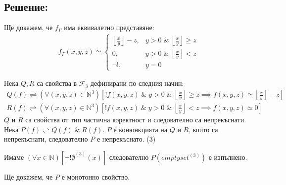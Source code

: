 \documentclass{article}
\begin{document}
\subsection*{Решение:}
Ще докажем, че \(f_\Gamma\) има еквивалетно представяне:
\begin{align*}
f_\Gamma(x, y, z) \simeq \begin{cases}
    \displaystyle\left\lfloor\frac{x}{y}\right\rfloor - z, & y > 0 \; \& \; \displaystyle\left\lfloor\frac{x}{y}\right\rfloor \geq z \\
    0, & y > 0 \; \& \; \displaystyle\left\lfloor\frac{x}{y}\right\rfloor < z \\
    \lnot!, & y = 0
\end{cases}
\end{align*}

Нека \(Q, R\) са свойства в \(\mathcal{F}_3\)
дефинирани по следния начин:
\begin{align*}
Q(f) \rightleftharpoons (\forall (x, y, z) \in \mathbb{N}^3)[!f(x, y, z) \; \& \; y > 0 \; \& \; \displaystyle\left\lfloor\frac{x}{y}\right\rfloor \geq z \implies f(x, y, z) \simeq \displaystyle\left\lfloor\frac{x}{y}\right\rfloor - z] \\
R(f) \rightleftharpoons (\forall (x, y, z) \in \mathbb{N}^3)[!f(x, y, z) \; \& \; y > 0 \; \& \; \displaystyle\left\lfloor\frac{x}{y}\right\rfloor < z \implies f(x, y, z) \simeq 0]
\end{align*}
\(Q\) и \(R\) са свойства от тип частична коректност и следователно са непрекъснати.
Нека \(P(f) \rightleftharpoons Q(f) \; \& \; R(f)\).
\(P\) е конюнкцията на \(Q\) и \(R\), които са непрекъснати, следователно \(P\) е непрекъснато. (3)

Имаме \((\forall x \in \mathbb{N})[\lnot!\emptyset^{(3)}(x)]\) следователно \(P(emptyset^{(3)})\) е изпълнено.

Ще докажем, че \(P\) е монотонно свойство.
\end{document}

